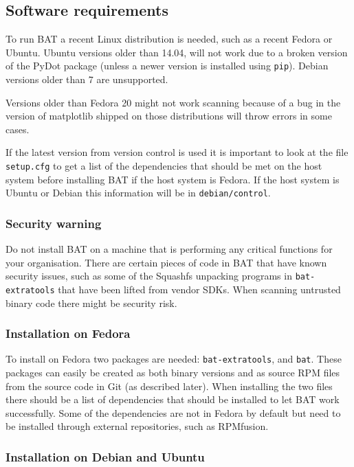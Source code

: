 \documentclass[10pt,a4paper]{article}
\begin{document}
\subsection{Software requirements}

To run BAT a recent Linux distribution is needed, such as a recent Fedora or
Ubuntu. Ubuntu versions older than 14.04, will not work due to a broken
version of the PyDot package (unless a newer version is installed using
\texttt{pip}). Debian versions older than 7 are unsupported.

Versions older than Fedora 20 might not work scanning because of a bug in the
version of matplotlib shipped on those distributions will throw errors in some
cases.

If the latest version from version control is used it is important to look at
the file \texttt{setup.cfg} to get a list of the dependencies that should be
met on the host system before installing BAT if the host system is Fedora. If
the host system is Ubuntu or Debian this information will be in
\texttt{debian/control}.

\subsubsection{Security warning}

Do not install BAT on a machine that is performing any critical functions for
your organisation. There are certain pieces of code in BAT that have known
security issues, such as some of the Squashfs unpacking programs in
\texttt{bat-extratools} that have been lifted from vendor SDKs. When scanning
untrusted binary code there might be security risk.

\subsubsection{Installation on Fedora}

To install on Fedora two packages are needed: \texttt{bat-extratools}, %
and \texttt{bat}. These packages can easily be created as both binary versions and
as source RPM files from the source code in Git (as described later). When
installing the two files there should be a list of dependencies that should be
installed to let BAT work successfully. Some of the dependencies are not in
Fedora by default but need to be installed through external repositories, such
as RPMfusion.

\subsubsection{Installation on Debian and Ubuntu}
\end{document}

